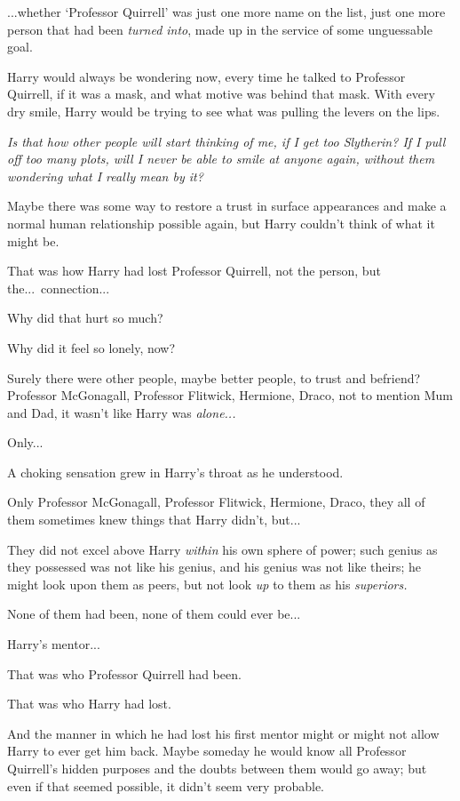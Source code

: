 ...whether ‘Professor Quirrell’ was just one more name on the list, just one more person that had been \emph{turned into}, made up in the service of some unguessable goal.

Harry would always be wondering now, every time he talked to Professor Quirrell, if it was a mask, and what motive was behind that mask. With every dry smile, Harry would be trying to see what was pulling the levers on the lips.

\emph{Is that how other people will start thinking of me, if I get too Slytherin? If I pull off too many plots, will I never be able to smile at anyone again, without them wondering what I really mean by it?}

Maybe there was some way to restore a trust in surface appearances and make a normal human relationship possible again, but Harry couldn’t think of what it might be.

That was how Harry had lost Professor Quirrell, not the person, but the...\ connection...

Why did that hurt so much?

Why did it feel so lonely, now?

Surely there were other people, maybe better people, to trust and befriend? Professor McGonagall, Professor Flitwick, Hermione, Draco, not to mention Mum and Dad, it wasn’t like Harry was \emph{alone...}

Only...

A choking sensation grew in Harry’s throat as he understood.

Only Professor McGonagall, Professor Flitwick, Hermione, Draco, they all of them sometimes knew things that Harry didn’t, but...

They did not excel above Harry \emph{within} his own sphere of power; such genius as they possessed was not like his genius, and his genius was not like theirs; he might look upon them as peers, but not look \emph{up} to them as his \emph{superiors.}

None of them had been, none of them could ever be...

Harry’s mentor...

That was who Professor Quirrell had been.

That was who Harry had lost.

And the manner in which he had lost his first mentor might or might not allow Harry to ever get him back. Maybe someday he would know all Professor Quirrell’s hidden purposes and the doubts between them would go away; but even if that seemed possible, it didn’t seem very probable.

